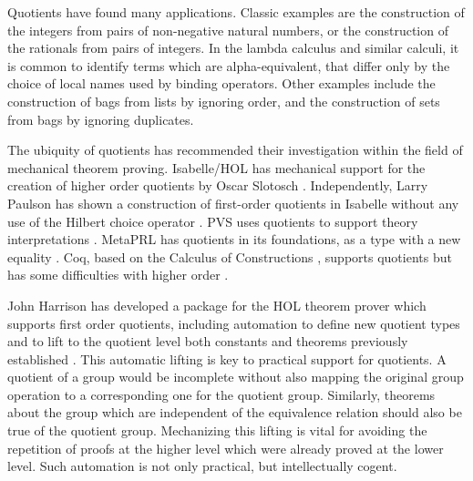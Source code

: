 \documentclass[envcountsame,runningheads]{llncs}
\begin{document}
Quotients have found many applications.  Classic examples are the construction
of the integers from pairs of non-negative natural numbers, or the construction
of the rationals from pairs of integers.  In the lambda calculus and
similar calculi, it is
common to identify terms which are alpha-equivalent, that differ only by
the choice of local names used by binding operators.
Other examples include the construction of bags from lists
by ignoring order,
and the construction of sets from bags
by ignoring duplicates.

The ubiquity of quotients has recommended their investigation
within the field of mechanical theorem proving.
Isabelle/HOL has mechanical support for the creation of
higher order quotients by Oscar Slotosch \cite{Slo97}. 
Independently, Larry Paulson has shown a construction of first-order quotients
in Isabelle without any use of the Hilbert choice operator
\cite{LP04}.
PVS uses quotients to support theory interpretations \cite{OwS01}.
MetaPRL has quotients in its foundations,
as a type with a new equality \cite{Nog02}.
Coq, based on the Calculus of Constructions \cite{Hof95},
supports quotients \cite{GPWZ02} but
has some difficulties with higher order
\cite{CPS02}.

John Harrison has developed a package for the 
HOL
theorem prover which
supports first order quotients, including automation to
define new quotient types
and to lift to the quotient level both constants 
and theorems previously established
\cite{Har98}.
%
This automatic lifting is key to practical support for quotients.
A quotient of a group
would be incomplete without also mapping the original group
operation to a corresponding one for the quotient group.
Similarly, theorems about the group
which are independent of the equivalence relation
should also be true of the quotient group.
Mechanizing this lifting is vital for avoiding the repetition of proofs
at the higher level which were already proved at the lower level.
Such automation is not only practical, but intellectually cogent.
\end{document}
